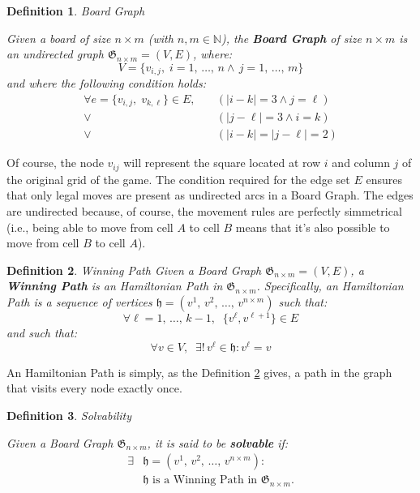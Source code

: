 \documentclass[conference]{IEEEtran}
\newtheorem{definition}{Definition}[section]
\begin{document}
\begin{definition}{Board Graph}{}
\label{def:board_graph}

Given a board of size $n \times m$ (with $n, m \in \mathbb{N}$), the \textbf{Board Graph} of size $n \times m$ is an undirected graph $\mathfrak{G}_{n \times m} = (V, E)$, where:
$$
    V = \{v_{i,j},\;i = 1,\,\dots,\,n \land \, j = 1,\,\dots,\,m\}
$$
and where the following condition holds:
\begin{align*}
\forall e = \{v_{i,j},\;v_{k,\ell}\} \in E,\quad&(|i - k| = 3 \land j = \ell) \\
\lor\,& (|j - \ell| = 3 \land i = k) \\
\lor\,& (|i - k| = |j - \ell| = 2)
\end{align*}

\end{definition}

Of course, the node $v_{ij}$ will represent the square located at row $i$ and column $j$ of the original grid of the game. 
The condition required for the edge set $E$ ensures that only legal moves are present as undirected arcs in a Board Graph. The edges are undirected because, of course, the movement rules are perfectly simmetrical (i.e., being able to move from cell $A$ to cell $B$ means that it's also possible to move from cell $B$ to cell $A$).

\begin{definition}{Winning Path}{} \label{def:winning_path}
Given a Board Graph $\mathfrak{G}_{n \times m} = (V, E)$, a \textbf{Winning Path} is an Hamiltonian Path in $\mathfrak{G}_{n \times m}$.
Specifically, an Hamiltonian Path is a sequence of vertices $\mathfrak{h} = (v^1,\,v^2,\,\dots,\,v^{n \times m})$ such that:
$$
    \forall \ell = 1,\,\dots,\,k-1,\;\; \{v^\ell, v^{\ell+1}\} \in E
$$
and such that:
$$
    \forall v \in V,\;\; \exists!\, v^\ell \in \mathfrak{h} : v^\ell = v
$$
\end{definition}

An Hamiltonian Path is simply, as the Definition \ref{def:winning_path} gives, a path in the graph that visits every node exactly once.

\begin{definition}{Solvability}{}
\label{def:solvability}

Given a Board Graph $\mathfrak{G}_{n \times m}$, it is said to be \textbf{solvable} if:
\begin{align*}
    \exists &\mathfrak{h} = (v^1,\,v^2,\,\dots,\,v^{n \times m}) : \\
            &\mathfrak{h} \text{ is a Winning Path in } \mathfrak{G}_{n \times m}.
\end{align*}
\end{definition}
\end{document}
